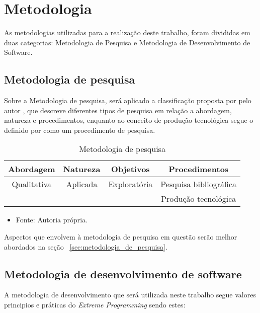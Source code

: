 \section{Metodologia}

As metodologias utilizadas para a realização deste trabalho, foram divididas em
duas categorias: Metodologia de Pesquisa e Metodologia de Desenvolvimento de
Software.

\subsection{Metodologia de pesquisa}

Sobre a Metodologia de pesquisa, será aplicado a classificação proposta por
pelo autor \cite{Gerhardt2009}, que descreve diferentes tipos de pesquisa em
relação a abordagem, natureza e procedimentos, enquanto ao conceito de produção
tecnológica segue o definido por \cite{Serzedello_Tomael_2011} como um
procedimento de pesquisa.

\begin{table}[ht]
   \centering
   \caption{Metodologia de pesquisa}
   \begin{tabular}{|c|c|c|c|}
      \hline
      \textbf{Abordagem} & \textbf{Natureza} & \textbf{Objetivos} & \textbf{Procedimentos} \\ \hline
      Qualitativa        & Aplicada          & Exploratória       & Pesquisa bibliográfica \\
                         &                   &                    & Produção tecnológica   \\ \hline
   \end{tabular}

   \begin{itemize}
      \item Fonte: Autoria própria.
   \end{itemize}

\end{table}

Aspectos que envolvem à metodologia de pesquisa em questão serão melhor
abordados na seção ~\ref{sec:metodologia_de_pesquisa}.

\subsection{Metodologia de desenvolvimento de software}

A metodologia de desenvolvimento que será utilizada neste trabalho segue
valores principios e práticas do \emph{Extreme
   Programming}\cite{10.5555/1076267} sendo estes:

